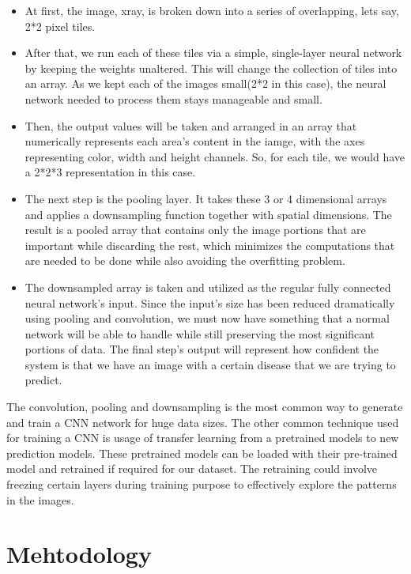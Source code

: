 \documentclass{article}
\begin{document}
    \begin{itemize}
        \item At first, the image, xray, is broken down into a series of overlapping, lets say, 2*2 pixel tiles.
        \item After that, we run each of these tiles via a simple, single-layer neural network by keeping the weights unaltered. This will change the collection of tiles into an array. As we kept each of the images small(2*2 in this case), the neural network needed to process them stays manageable and small.
        \item Then, the output values will be taken and arranged in an array that numerically represents each area’s content in the iamge, with the axes representing color, width and height channels. So, for each tile, we would have a 2*2*3 representation in this case.
        \item The next step is the pooling layer. It takes these 3 or 4 dimensional arrays and applies a downsampling function together with spatial dimensions. The result is a pooled array that contains only the image portions that are important while discarding the rest, which minimizes the computations that are needed to be done while also avoiding the overfitting problem.
        \item The downsampled array is taken and utilized as the regular fully connected neural network’s input. Since the input’s size has been reduced dramatically using pooling and convolution, we must now have something that a normal network will be able to handle while still preserving the most significant portions of data. The final step’s output will represent how confident the system is that we have an image with a certain disease that we are trying to predict.
    \end{itemize}
    The convolution, pooling and downsampling is the most common way to generate and train a CNN network for huge data sizes. The other common technique used for training a CNN is usage of transfer learning from a pretrained models to new prediction models. These pretrained models can be loaded with their pre-trained model and retrained if required for our dataset. The retraining could involve freezing certain layers during training purpose to effectively explore the patterns in the images.

    \section{Mehtodology}
\end{document}
